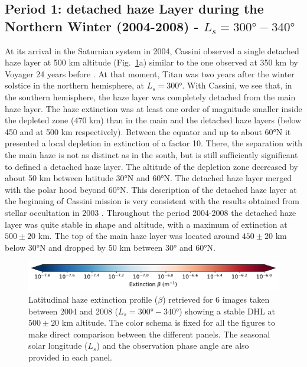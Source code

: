 \subsection{Period 1:  detached haze Layer during the Northern Winter (2004-2008) - $L_s=\ang{300}-\ang{340}$}

At its arrival in the Saturnian system in 2004, Cassini observed a single detached haze layer at 500 km altitude
(Fig.~\ref{fig:dhl_2004_2008}a) similar to the one observed at 350 km by Voyager 24 years before
\citep{Smith1981}. At that moment, Titan was two years after the winter solstice in the northern hemisphere, at $L_s=\ang{300}$.
With Cassini, we see that, in the southern hemisphere, the haze layer was completely detached from the main haze layer.
The haze extinction was at least one order of magnitude smaller inside the depleted zone (470 km) than in the main and
the detached haze layers (below 450 and at 500 km respectively).
Between the equator and up to about \ang{60}N it presented a local depletion in extinction
of a factor 10. There, the separation with the main haze is not as distinct as in the south, but is still sufficiently significant to
defined a detached haze layer.
The altitude of the depletion zone decreased by about 50 km between latitude \ang{30}N  and \ang{60}N.
The detached haze layer merged with the polar hood beyond \ang{60}N. This description of the detached haze layer at
the beginning of Cassini mission is very consistent with the results obtained from stellar occultation in 2003 \citep{Sicardy2006}.
Throughout the period 2004-2008 the detached haze layer was quite stable in shape and  altitude, with a maximum of extinction
at $500 \pm 20$ km. The top of the main haze layer was located around $450 \pm 20$ km below \ang{30}N and dropped
by 50 km between \ang{30} and \ang{60}N.

\begin{figure}[!ht]
\includegraphics[width=.5\textwidth]{Fig/Extinction_colorbar}
\caption{Latitudinal haze extinction profile ($\beta$) retrieved for 6 images taken between 2004 and 2008
($L_s=\ang{300}-\ang{340}$) showing a stable DHL at $500 \pm 20$ km altitude.
The color schema is fixed for all the figures to make direct comparison
between the different panels. The seasonal solar longitude ($L_s$) and the observation phase angle are
also provided in each panel.}
\label{fig:dhl_2004_2008}
\end{figure}

